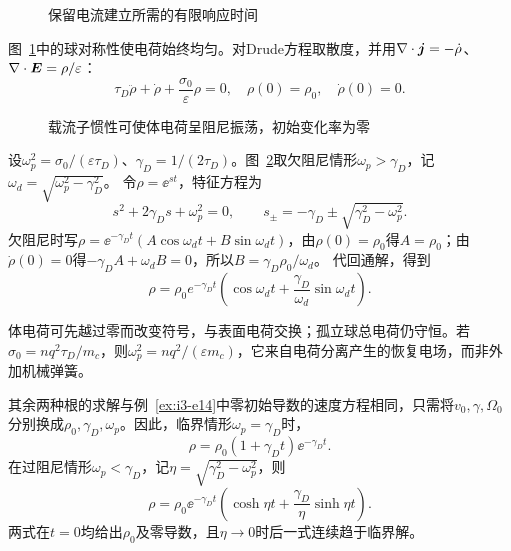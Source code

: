 \begin{figure}[H]\centering
{}
\caption{保留电流建立所需的有限响应时间}\label{fig:i3-e19-q}
\end{figure}
\begin{solution}
图~\ref{fig:i3-e19-q}中的球对称性使电荷始终均匀。对Drude方程取散度，并用$\nabla\cdot\bm{j}=-\dot\rho$、$\nabla\cdot\bm{E}=\rho/\varepsilon$：
\[
\tau_D\ddot\rho+\dot\rho+\frac{\sigma_0}{\varepsilon}\rho=0,\quad
\rho(0)=\rho_0,\quad\dot\rho(0)=0.
\]

\begin{figure}[H]\centering
{}
\caption{载流子惯性可使体电荷呈阻尼振荡，初始变化率为零}\label{fig:i3-e19-s}
\end{figure}

设$\omega_p^2=\sigma_0/(\varepsilon\tau_D)$、$\gamma_D=1/(2\tau_D)$。图~\ref{fig:i3-e19-s}取欠阻尼情形$\omega_p>\gamma_D$，记$\omega_d=\sqrt{\omega_p^2-\gamma_D^2}$。
令$\rho=\ee^{st}$，特征方程为
\[
s^2+2\gamma_Ds+\omega_p^2=0,\qquad
s_\pm=-\gamma_D\pm\sqrt{\gamma_D^2-\omega_p^2}.
\]
欠阻尼时写$\rho=\ee^{-\gamma_Dt}(A\cos\omega_dt+B\sin\omega_dt)$，由$\rho(0)=\rho_0$得$A=\rho_0$；由$\dot\rho(0)=0$得$-\gamma_DA+\omega_dB=0$，所以$B=\gamma_D\rho_0/\omega_d$。
代回通解，得到
\[\rho=\rho_0e^{-\gamma_Dt}\left(\cos\omega_dt
+\frac{\gamma_D}{\omega_d}\sin\omega_dt\right).\]

体电荷可先越过零而改变符号，与表面电荷交换；孤立球总电荷仍守恒。若$\sigma_0=nq^2\tau_D/m_c$，则$\omega_p^2=nq^2/(\varepsilon m_c)$，它来自电荷分离产生的恢复电场，而非外加机械弹簧。

其余两种根的求解与例~\ref{ex:i3-e14}中零初始导数的速度方程相同，只需将$v_0,\gamma,\Omega_0$分别换成$\rho_0,\gamma_D,\omega_p$。因此，临界情形$\omega_p=\gamma_D$时，
\[
\rho=\rho_0(1+\gamma_Dt)\ee^{-\gamma_Dt}.
\]
在过阻尼情形$\omega_p<\gamma_D$，记$\eta=\sqrt{\gamma_D^2-\omega_p^2}$，则
\[
\rho=\rho_0\ee^{-\gamma_Dt}
\left(\cosh\eta t+\frac{\gamma_D}{\eta}\sinh\eta t\right).
\]
两式在$t=0$均给出$\rho_0$及零导数，且$\eta\to0$时后一式连续趋于临界解。


\end{solution}
